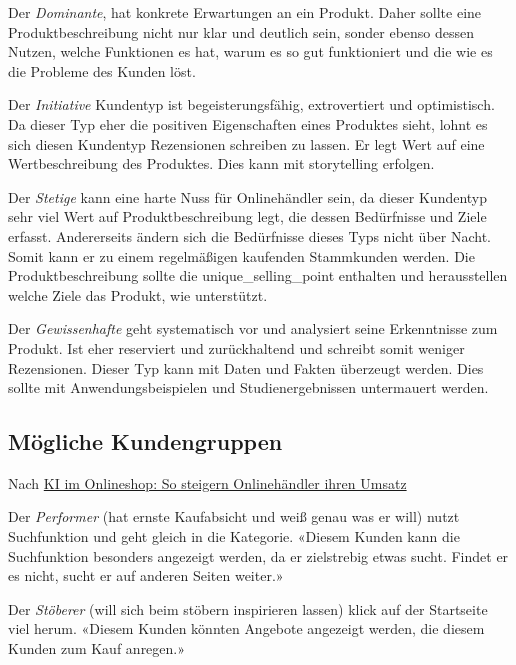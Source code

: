 Der \textit{Dominante}, hat konkrete Erwartungen an ein Produkt. Daher sollte eine Produktbeschreibung nicht nur klar und deutlich sein, sonder ebenso dessen Nutzen, welche Funktionen es hat, warum es so gut funktioniert und die wie es die Probleme des Kunden löst.\vspace{0.2cm}

Der \textit{Initiative} Kundentyp ist begeisterungsfähig, extrovertiert und optimistisch. Da dieser Typ eher die positiven Eigenschaften eines Produktes sieht, lohnt es sich diesen Kundentyp Rezensionen schreiben zu lassen. Er legt Wert auf eine Wertbeschreibung des Produktes. Dies kann mit \Gls{storytelling} erfolgen.\vspace{0.2cm}

Der \textit{Stetige} kann eine harte Nuss für Onlinehändler sein, da dieser Kundentyp sehr viel Wert auf Produktbeschreibung legt, die dessen Bedürfnisse und Ziele erfasst. Andererseits ändern sich die Bedürfnisse dieses Typs nicht über Nacht. Somit kann er zu einem regelmäßigen kaufenden Stammkunden werden. Die Produktbeschreibung sollte die \Gls{unique_selling_point} enthalten und herausstellen welche Ziele das Produkt, wie unterstützt.\vspace{0.2cm}

Der \textit{Gewissenhafte} geht systematisch vor und analysiert seine Erkenntnisse zum Produkt. Ist eher reserviert und zurückhaltend und schreibt somit weniger Rezensionen. Dieser Typ kann mit Daten und Fakten überzeugt werden. Dies sollte mit Anwendungsbeispielen und Studienergebnissen untermauert werden.

\subsection{Mögliche Kundengruppen}
Nach \href{https://www.exali.de/Info-Base/ki-onlineshop}{KI im Onlineshop: So steigern Onlinehändler ihren Umsatz}\vspace{0.2cm}

Der \textit{Performer} (hat ernste Kaufabsicht und weiß genau was er will) nutzt Suchfunktion und geht gleich in die Kategorie. «Diesem Kunden kann die Suchfunktion besonders angezeigt werden, da er zielstrebig etwas sucht. Findet er es nicht, sucht er auf anderen Seiten weiter.»\vspace{0.2cm}

Der \textit{Stöberer} (will sich beim stöbern inspirieren lassen) klick auf der Startseite viel herum. «Diesem Kunden könnten Angebote angezeigt werden, die diesem Kunden zum Kauf anregen.»\vspace{0.2cm}

